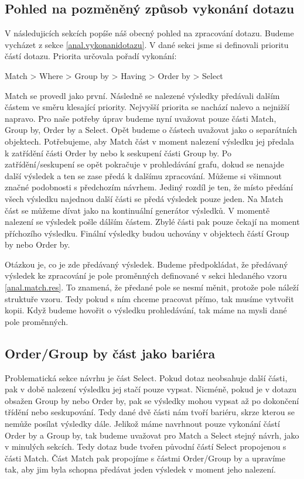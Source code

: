 \subsection{Pohled na pozměněný způsob vykonání dotazu}

V následujicích sekcích popíše náš obecný pohled na zpracování dotazu.
Budeme vycházet z sekce \ref{anal.vykonanidotazu}.
V dané sekci jsme si definovali prioritu částí dotazu.
Priorita určovala pořadí vykonání:
\begin{code}
Match > Where > Group by > Having > Order by > Select
\end{code}
Match se provedl jako první.
Následně se nalezené výsledky předávali dalším částem ve směru klesající priority.
Nejvyšší priorita se nachází nalevo a nejnižší napravo.
Pro naše potřeby úprav budeme nyní uvažovat pouze části Match, Group by, Order by a Select.
Opět budeme o částech uvažovat jako o separátních objektech.
Potřebujeme, aby Match část v moment nalezení výsledku jej předala k zatřídění části Order by nebo k seskupení části Group by.
Po zatřídění/seskupení se opět pokračuje v prohledávání grafu, dokud se nenajde další výsledek a ten se zase předá k dalšímu zpracování.
Můžeme si všimnout značné podobnosti s předchozím návrhem. 
Jediný rozdíl je ten, že místo předání všech výsledku najednou další části se předá výsledek pouze jeden.
Na Match část se můžeme dívat jako na kontinuální generátor výsledků. 
V momentě nalezení se výsledek pošle dálším částem.
Zbylé části pak pouze čekají na moment příchozího výsledku.
Finální výsledky budou uchovány v objektech částí Group by nebo Order by. 

Otázkou je, co je zde předávaný výsledek.
Budeme předpokládat, že předávaný výsledek ke zpracování je pole proměnných definované v sekci hledaného vzoru \ref{anal.match.res}.
To znamená, že předané pole se nesmí měnit, protože pole náleží struktuře vzoru.
Tedy pokud s ním chceme pracovat přímo, tak musíme vytvořit kopii.
Když budeme hovořit o výsledku prohledávání, tak máme na mysli dané pole proměnných.

\subsection{Order/Group by část jako bariéra}

Problematická sekce návrhu je část Select.
Pokud dotaz neobsahuje další části, pak v době nalezení výsledku jej stačí pouze vypsat.
Nicméně, pokud je v dotazu obsažen Group by nebo Order by, pak se výsledky mohou vypsat až po dokončení třídění nebo seskupování.
Tedy dané dvě části nám tvoří bariéru, skrze kterou se nemůže posílat výsledky dále.
Jelikož máme navrhnout pouze vykonání částí Order by a Group by, tak budeme uvažovat pro Match a Select stejný návrh, jako v minulých sekcích.
Tedy dotaz bude tvořen původní částí Select propojenou s části Match.
Část Match pak propojíme s částmi Order/Group by a upravíme tak, aby jim byla schopna předávat jeden výsledek v moment jeho nalezení.  

